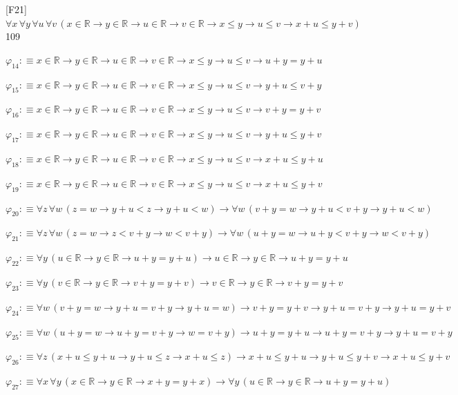 \begin{fullproof}{[F21]}{$\forall x\,\forall y\,\forall u\,\forall v\,(x \in \mathbb{R} \to y \in \mathbb{R} \to u \in \mathbb{R} \to v \in \mathbb{R} \to x \leq y \to u \leq v \to x + u \leq y + v)$}{109}
\begin{abbrevlist}
\item $\varphi_{14} :\equiv x \in \mathbb{R} \to y \in \mathbb{R} \to u \in \mathbb{R} \to v \in \mathbb{R} \to x \leq y \to u \leq v \to u + y = y + u$
\item $\varphi_{15} :\equiv x \in \mathbb{R} \to y \in \mathbb{R} \to u \in \mathbb{R} \to v \in \mathbb{R} \to x \leq y \to u \leq v \to y + u \leq v + y$
\item $\varphi_{16} :\equiv x \in \mathbb{R} \to y \in \mathbb{R} \to u \in \mathbb{R} \to v \in \mathbb{R} \to x \leq y \to u \leq v \to v + y = y + v$
\item $\varphi_{17} :\equiv x \in \mathbb{R} \to y \in \mathbb{R} \to u \in \mathbb{R} \to v \in \mathbb{R} \to x \leq y \to u \leq v \to y + u \leq y + v$
\item $\varphi_{18} :\equiv x \in \mathbb{R} \to y \in \mathbb{R} \to u \in \mathbb{R} \to v \in \mathbb{R} \to x \leq y \to u \leq v \to x + u \leq y + u$
\item $\varphi_{19} :\equiv x \in \mathbb{R} \to y \in \mathbb{R} \to u \in \mathbb{R} \to v \in \mathbb{R} \to x \leq y \to u \leq v \to x + u \leq y + v$
\item $\varphi_{20} :\equiv \forall z\,\forall w\,(z = w \to y + u < z \to y + u < w) \to \forall w\,(v + y = w \to y + u < v + y \to y + u < w)$
\item $\varphi_{21} :\equiv \forall z\,\forall w\,(z = w \to z < v + y \to w < v + y) \to \forall w\,(u + y = w \to u + y < v + y \to w < v + y)$
\item $\varphi_{22} :\equiv \forall y\,(u \in \mathbb{R} \to y \in \mathbb{R} \to u + y = y + u) \to u \in \mathbb{R} \to y \in \mathbb{R} \to u + y = y + u$
\item $\varphi_{23} :\equiv \forall y\,(v \in \mathbb{R} \to y \in \mathbb{R} \to v + y = y + v) \to v \in \mathbb{R} \to y \in \mathbb{R} \to v + y = y + v$
\item $\varphi_{24} :\equiv \forall w\,(v + y = w \to y + u = v + y \to y + u = w) \to v + y = y + v \to y + u = v + y \to y + u = y + v$
\item $\varphi_{25} :\equiv \forall w\,(u + y = w \to u + y = v + y \to w = v + y) \to u + y = y + u \to u + y = v + y \to y + u = v + y$
\item $\varphi_{26} :\equiv \forall z\,(x + u \leq y + u \to y + u \leq z \to x + u \leq z) \to x + u \leq y + u \to y + u \leq y + v \to x + u \leq y + v$
\item $\varphi_{27} :\equiv \forall x\,\forall y\,(x \in \mathbb{R} \to y \in \mathbb{R} \to x + y = y + x) \to \forall y\,(u \in \mathbb{R} \to y \in \mathbb{R} \to u + y = y + u)$

\end{abbrevlist}
\end{fullproof}
